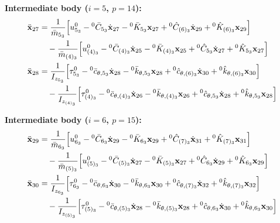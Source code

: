 \textbf{Intermediate body ($i=5$, $p=14$):}
\begin{align}
    \ddot{\mathbf{x}}_{27} &=
    \frac{1}{\bar{m}_{5_3}} \Big[ u^0_{5_3} - {}^0\bar{C}_{5_3}\dot{\mathbf{x}}_{27} - {}^0\bar{K}_{5_3}\mathbf{x}_{27} + {}^0\hat{C}_{(6)_3}\dot{\mathbf{x}}_{29} + {}^0\hat{K}_{(6)_3}\mathbf{x}_{29} \Big] \notag \\
    &\quad - \frac{1}{\bar{m}_{(4)_3}} \Big[ u^0_{(4)_3} - {}^0\bar{C}_{(4)_3}\dot{\mathbf{x}}_{25} - {}^0\bar{K}_{(4)_3}\mathbf{x}_{25} + {}^0\hat{C}_{5_3}\dot{\mathbf{x}}_{27} + {}^0\hat{K}_{5_3}\mathbf{x}_{27} \Big] \\
    \ddot{\mathbf{x}}_{28} &=
    \frac{1}{I_{z_{5_3}}} \Big[ \tau^0_{5_3} - {}^0\bar{c}_{\theta,5_3}\dot{\mathbf{x}}_{28} - {}^0\bar{k}_{\theta,5_3}\mathbf{x}_{28} + {}^0\hat{c}_{\theta,(6)_3}\dot{\mathbf{x}}_{30} + {}^0\hat{k}_{\theta,(6)_3}\mathbf{x}_{30} \Big] \notag \\
    &\quad - \frac{1}{I_{z_{(4)_3}}} \Big[ \tau^0_{(4)_3} - {}^0\bar{c}_{\theta,(4)_3}\dot{\mathbf{x}}_{26} - {}^0\bar{k}_{\theta,(4)_3}\mathbf{x}_{26} + {}^0\hat{c}_{\theta,5_3}\dot{\mathbf{x}}_{28} + {}^0\hat{k}_{\theta,5_3}\mathbf{x}_{28} \Big]
\end{align}

\textbf{Intermediate body ($i=6$, $p=15$):}
\begin{align}
    \ddot{\mathbf{x}}_{29} &=
    \frac{1}{\bar{m}_{6_3}} \Big[ u^0_{6_3} - {}^0\bar{C}_{6_3}\dot{\mathbf{x}}_{29} - {}^0\bar{K}_{6_3}\mathbf{x}_{29} + {}^0\hat{C}_{(7)_3}\dot{\mathbf{x}}_{31} + {}^0\hat{K}_{(7)_3}\mathbf{x}_{31} \Big] \notag \\
    &\quad - \frac{1}{\bar{m}_{(5)_3}} \Big[ u^0_{(5)_3} - {}^0\bar{C}_{(5)_3}\dot{\mathbf{x}}_{27} - {}^0\bar{K}_{(5)_3}\mathbf{x}_{27} + {}^0\hat{C}_{6_3}\dot{\mathbf{x}}_{29} + {}^0\hat{K}_{6_3}\mathbf{x}_{29} \Big] \\
    \ddot{\mathbf{x}}_{30} &=
    \frac{1}{I_{z_{6_3}}} \Big[ \tau^0_{6_3} - {}^0\bar{c}_{\theta,6_3}\dot{\mathbf{x}}_{30} - {}^0\bar{k}_{\theta,6_3}\mathbf{x}_{30} + {}^0\hat{c}_{\theta,(7)_3}\dot{\mathbf{x}}_{32} + {}^0\hat{k}_{\theta,(7)_3}\mathbf{x}_{32} \Big] \notag \\
    &\quad - \frac{1}{I_{z_{(5)_3}}} \Big[ \tau^0_{(5)_3} - {}^0\bar{c}_{\theta,(5)_3}\dot{\mathbf{x}}_{28} - {}^0\bar{k}_{\theta,(5)_3}\mathbf{x}_{28} + {}^0\hat{c}_{\theta,6_3}\dot{\mathbf{x}}_{30} + {}^0\hat{k}_{\theta,6_3}\mathbf{x}_{30} \Big]
\end{align}

